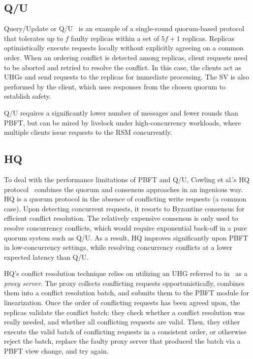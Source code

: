 \documentclass[twocolumn,10pt]{article}
\begin{document}
\subsection{Q/U}

Query/Update or Q/U~\cite{fault-scalable-sosp-05} is an example of a
single-round quorum-based protocol that tolerates up to $f$ faulty
replicas within a set of $5f+1$ replicas. Replicas optimistically
execute requests locally without explicitly agreeing on a common
order. When an ordering conflict is detected among replicas, client
requests need to be aborted and retried to resolve the conflict.  In
this case, the clients act as UHGs and send requests to the replicas
for immediate processing. The SV is also performed by the client,
which uses responses from the chosen quorum to establish safety.

Q/U requires a significantly lower number of messages and fewer
rounds than PBFT, but can be mired by livelock under high-concurrency
workloads, where multiple clients issue requests to the RSM
concurrently.  

\subsection{HQ}

To deal with the performance limitations of PBFT and Q/U, Cowling
et al.'s HQ protocol~\cite{hq-replication-osdi-06} combines the quorum
and consensus approaches in an ingenious way.  HQ is a quorum protocol
in the absence of conflicting write requests (a common case). Upon
detecting concurrent requests, it resorts to Byzantine consensus for
efficient conflict resolution.  The relatively expensive consensus is
only used to resolve concurrency conflicts, which would require
exponential back-off in a pure quorum system such as Q/U.  As a
result, HQ improves significantly upon PBFT in low-concurrency 
settings, while resolving concurrency conflicts at a lower expected 
latency than Q/U. 

HQ's conflict resolution technique relies on
utilizing an UHG referred to in~\cite{hq-replication-osdi-06} as a
\emph{proxy server}. The proxy collects 
conflicting requests opportunistically, combines them into a conflict
resolution batch, and submits them to the PBFT module for
linearization. Once the order of conflicting requests has been agreed
upon, the replicas validate the conflict batch: they check whether a
conflict resolution was really needed, and whether all conflicting
requests are valid.  Then, they either execute the valid batch of
conflicting requests in a consistent order, or otherwise reject the
batch, replace the faulty proxy server that produced the batch via a
PBFT view change, and try again.
\end{document}

